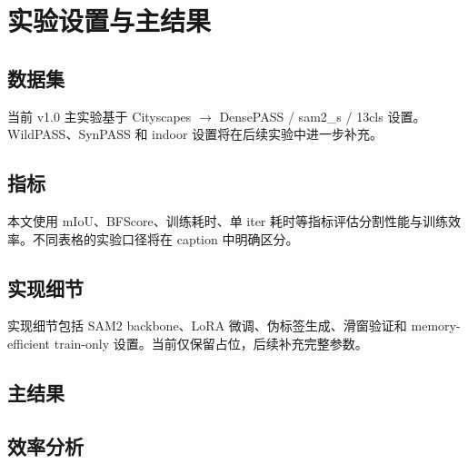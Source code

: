\section{实验设置与主结果}
\label{sec:experiments}

\subsection{数据集}
当前 v1.0 主实验基于 Cityscapes $\rightarrow$ DensePASS / sam2\_s / 13cls 设置。WildPASS、SynPASS 和 indoor 设置将在后续实验中进一步补充。

\subsection{指标}
本文使用 mIoU、BFScore、训练耗时、单 iter 耗时等指标评估分割性能与训练效率。不同表格的实验口径将在 caption 中明确区分。

\subsection{实现细节}
实现细节包括 SAM2 backbone、LoRA 微调、伪标签生成、滑窗验证和 memory-efficient train-only 设置。当前仅保留占位，后续补充完整参数。

\subsection{主结果}


\subsection{效率分析}


